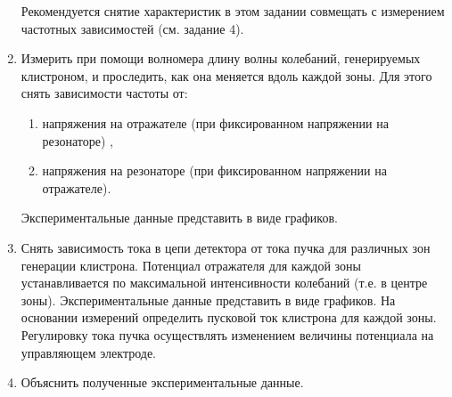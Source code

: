 \begin{enumerate}
	Рекомендуется снятие характеристик в этом задании совмещать с измерением частотных зависимостей (см. задание 4).

	\item Измерить при помощи волномера длину волны колебаний, генерируемых клистроном, и проследить, как она меняется вдоль каждой зоны. Для
	этого снять зависимости частоты от:
		\begin{enumerate}
			\item  напряжения на отражателе (при фиксированном напряжении на резонаторе) ,
			\item  напряжения на резонаторе (при фиксированном напряжении на отражателе).
		\end{enumerate}
	
	Экспериментальные данные представить в виде графиков.

	\item  Снять зависимость тока в цепи детектора от тока пучка для различных зон генерации клистрона. Потенциал отражателя для каждой зоны устанавливается по максимальной интенсивности колебаний (т.е. в центре зоны). Экспериментальные данные представить в виде графиков. На основании измерений определить пусковой ток клистрона для каждой зоны. Регулировку	тока пучка осуществлять изменением величины потенциала на управляющем электроде.

	\item  Объяснить полученные экспериментальные данные.

\end{enumerate}
\newpage
